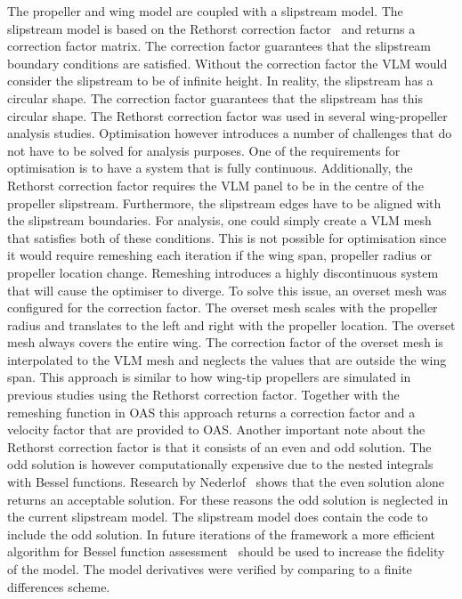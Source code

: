 The propeller and wing model are coupled with a slipstream model. The slipstream model is based on the Rethorst correction factor~\cite{rethorst1958aerodynamic} and returns a correction factor matrix. The correction factor guarantees that the slipstream boundary conditions are satisfied. Without the correction factor the VLM would consider the slipstream to be of infinite height. In reality, the slipstream has a circular shape. The correction factor guarantees that the slipstream has this circular shape. The Rethorst correction factor was used in several wing-propeller analysis studies. Optimisation however introduces a number of challenges that do not have to be solved for analysis purposes. One of the requirements for optimisation is to have a system that is fully continuous. Additionally, the Rethorst correction factor requires the VLM panel to be in the centre of the propeller slipstream. Furthermore, the slipstream edges have to be aligned with the slipstream boundaries. For analysis, one could simply create a VLM mesh that satisfies both of these conditions. This is not possible for optimisation since it would require remeshing each iteration if the wing span, propeller radius or propeller location change. Remeshing introduces a highly discontinuous system that will cause the optimiser to diverge. To solve this issue, an overset mesh was configured for the correction factor. The overset mesh scales with the propeller radius and translates to the left and right with the propeller location. The overset mesh always covers the entire wing. The correction factor of the overset mesh is interpolated to the VLM mesh and neglects the values that are outside the wing span. This approach is similar to how wing-tip propellers are simulated in previous studies using the Rethorst correction factor. Together with the remeshing function in OAS this approach returns a correction factor and a velocity factor that are provided to OAS. Another important note about the Rethorst correction factor is that it consists of an even and odd solution. The odd solution is however computationally expensive due to the nested integrals with Bessel functions. Research by Nederlof~\cite{nederlof2020improved} shows that the even solution alone returns an acceptable solution. For these reasons the odd solution is neglected in the current slipstream model. The slipstream model does contain the code to include the odd solution. In future iterations of the framework a more efficient algorithm for Bessel function assessment~\cite{DEAmos_Algorithm644} should be used to increase the fidelity of the model. The model derivatives were verified by comparing to a finite differences scheme.\\
